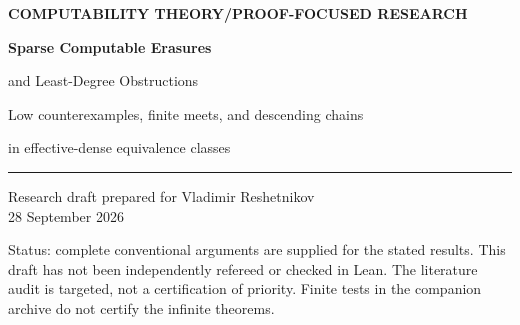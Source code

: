 \documentclass[11pt,a4paper]{article}
\newcommand{\repo}{\textsc{ProveIt}}
\theoremstyle{definition}
\theoremstyle{remark}
\begin{document}
\hypersetup{pageanchor=false}
\begin{titlepage}
\vspace*{10mm}
{\small\sffamily\bfseries\color{navy}COMPUTABILITY THEORY\quad /\quad PROOF-FOCUSED RESEARCH\par}
\vspace{13mm}
{\Huge\bfseries\color{navy}Sparse Computable Erasures\par}
\vspace{5mm}
{\LARGE and Least-Degree Obstructions\par}
\vspace{9mm}
{\large Low counterexamples, finite meets, and descending chains\par
in effective-dense equivalence classes\par}
\vspace{12mm}
\noindent\rule{\textwidth}{0.5pt}
\vspace{4mm}
\noindent Research draft prepared for Vladimir Reshetnikov\\[3pt]
28 September 2026
\vspace{8mm}
\begin{abstract}
We give a negative answer to the effective-dense least-representative question
C2 in the \repo\ research programme, in both its uniform and nonuniform
versions. If a binary set $G$ is $1$-generic and computes no function eventually
different from every computable function, neither equivalence class of $G$
has an element of least ordinary Turing degree. Every $2$-generic satisfies
the hypothesis. A classical highness characterization also supplies all
non-high $1$-generics, including low $\Delta^0_2$ examples.

The key step turns a density-zero omission set into a bounded choice function.
An infinitely often computable agreement yields a decidable sparse mask that
escapes that omission set. Genericity then prevents recovery of an
effective-dense description from the erased oracle. For every unbounded
computable order $b$, the mask can satisfy
$|T\cap[0,N)|\leq b(N)$ at every prefix. We also identify the exact lattice
of degrees arising from computable masks, prove a uniform countable
simultaneous-avoidance theorem, and construct a strictly descending chain
inside one uniform class, all within the same budget, with no lower bound
belonging to the full nonuniform class. Every member of the chain can be low.

The main erasure argument and the $2$-generic route are proved directly.
The low-example refinement explicitly uses the classical
Kjos-Hanssen--Merkle--Stephan characterization, rather than presenting it as
new. The article records its source audit, formalization obligations, and
further questions.
\end{abstract}
\vfill
\noindent\small\color{muted}
Status: complete conventional arguments are supplied for the stated results.
This draft has not been independently refereed or checked in Lean.
The literature audit is targeted, not a certification of priority.
Finite tests in the companion archive do not certify the infinite theorems.
\end{titlepage}
\hypersetup{pageanchor=true}
\tableofcontents
\end{document}
